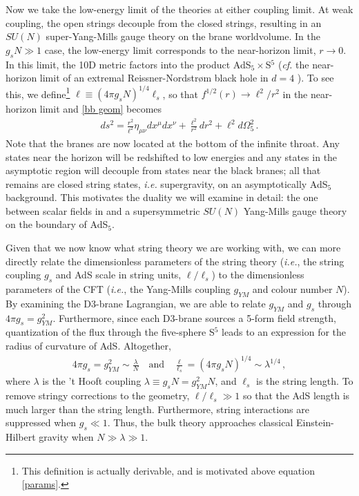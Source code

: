 \documentclass[../PhD.tex]{subfiles}
\begin{document}
Now we take the low-energy limit of the theories at either coupling limit. At weak coupling, the open strings decouple from the closed strings, resulting in an $SU(N)$ super-Yang-Mills gauge theory on the brane worldvolume. In the $g_s N \gg 1$ case, the low-energy limit corresponds to the near-horizon limit, $r \to 0$. In this limit, the 10D metric factors into the product AdS$_5 \times$S$^5$ ({\it cf.} the near-horizon limit of an extremal Reissner-Nordstr\o m black hole in $d=4$ \cite{Horowitz:1991cd}). To see this, we define\footnote{ This definition is actually derivable, and is motivated above equation \eqref{params}.} $\ell \equiv (4\pi g_s N)^{1/4} \ell_s$, so that $f^{1/2}(r) \to \ell^2 / r^2$ in the near-horizon limit and \eqref{bb geom} becomes
\begin{align}
\label{param rels}
ds^2 = \frac{r^2}{\ell^2} \eta_{\mu \nu} dx^\mu dx^\nu + \frac{\ell^2}{r^2}dr^2 + \ell^2 d\Omega_5^2 \, .
\end{align}
Note that the branes are now located at the bottom of the infinite throat. Any states near the horizon will be redshifted to low energies and any states in the asymptotic region will decouple from states near the black branes; all that remains are closed string states, {\it i.e.} supergravity, on an asymptotically AdS$_5$ background. This motivates the duality we will examine in detail: the one between scalar fields in \ads and a supersymmetric $SU(N)$ Yang-Mills gauge theory on the boundary of AdS$_5$.

Given that we now know what string theory we are working with, we can more directly relate the dimensionless parameters of the string theory ({\it i.e.}, the string coupling $g_s$ and AdS scale in string units, $\ell / \ell_s$) to the dimensionless parameters of the CFT ({\it i.e.}, the Yang-Mills coupling $g_{YM}$ and colour number $N$). By examining the D3-brane Lagrangian, we are able to relate $g_{YM}$ and $g_s$ through $4\pi g_s = g_{YM}^2$. Furthermore, since each D3-brane sources a 5-form field strength, quantization of the flux through the five-sphere S$^5$ leads to an expression for the radius of curvature of AdS. Altogether,
\begin{align}
\label{params}
4\pi g_s = g_{YM}^2 \sim \frac{\lambda}{N} \quad \text{and} \quad \frac{\ell}{\ell_s} = \left( 4\pi g_s N \right)^{1/4} \sim \lambda^{1/4} \, ,
\end{align}
where $\lambda$ is the 't Hooft coupling $\lambda \equiv g_s N = g_{YM}^2 N$, and $\ell_s$ is the string length. To remove stringy corrections to the geometry, $\ell / \ell_s \gg 1$ so that the AdS length is much larger than the string length. Furthermore, string interactions are suppressed when $g_s \ll 1$. Thus, the bulk theory approaches  classical Einstein-Hilbert gravity when $N \gg \lambda \gg 1$.
\end{document}
